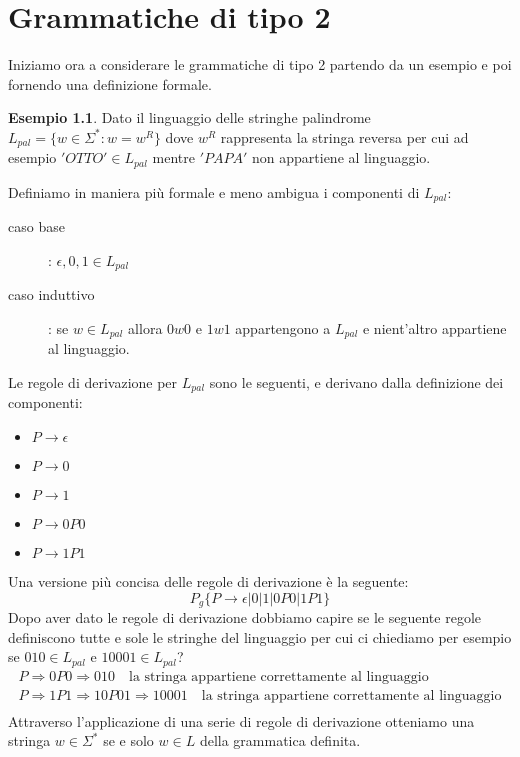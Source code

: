 \documentclass[a4paper]{book}
\theoremstyle{definition}%
\newtheorem*{esempio}{Esempio}
\begin{document}
\chapter{Grammatiche di tipo 2}
Iniziamo ora a considerare le grammatiche di tipo 2 partendo da un esempio e poi fornendo una definizione formale.
\begin{esempio}
  Dato il linguaggio delle stringhe palindrome $L _{pal} = \{w \in \Sigma ^ * : w = w ^ R\}$ dove $w^R$ rappresenta la stringa
  reversa per cui ad esempio $'OTTO' \in L_{pal}$ mentre $'PAPA'$ non appartiene al linguaggio.
 
  Definiamo in maniera più formale e meno ambigua i componenti di $L_{pal}$:
  \begin{description}
  \item [caso base]: $\epsilon, 0, 1 \in L_{pal}$
  \item [caso induttivo]: se $w \in L_{pal}$ allora $0w0$ e $1w1$ appartengono a $L_{pal}$ e nient'altro appartiene al linguaggio.
  \end{description}
  Le regole di derivazione per $L_{pal}$ sono le seguenti, e derivano dalla definizione dei componenti:
  \begin{itemize}
  \item $P \to \epsilon$
  \item $P \to 0$
  \item $P \to 1$
  \item $P \to 0P0$
  \item $P \to 1P1$
  \end{itemize}
  Una versione più concisa delle regole di derivazione è la seguente:
  \[ P_g\{P \to \epsilon | 0 | 1 | 0P0 | 1P1\} \]
  Dopo aver dato le regole di derivazione dobbiamo capire se le seguente regole definiscono tutte e sole le stringhe del linguaggio per
  cui ci chiediamo per esempio se $010 \in L_{pal}$ e $10001 \in L_{pal}$?
  \begin{align}
    P \Rightarrow 0P0 \Rightarrow 010  \quad \text{la stringa appartiene correttamente al linguaggio}\\
    P \Rightarrow 1P1 \Rightarrow 10P01 \Rightarrow 10001 \quad \text{la stringa appartiene correttamente al linguaggio}\\
  \end{align}
  Attraverso l'applicazione di una serie di regole di derivazione otteniamo una stringa $w \in \Sigma ^*$ se e solo $w \in L$
  della grammatica definita.
\end{esempio}
\end{document}

